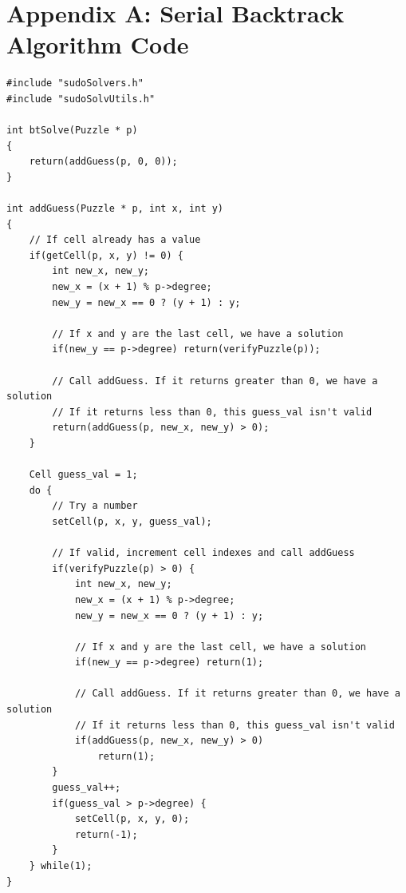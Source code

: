 \documentclass[11pt, a4paper]{article} %
\begin{document}
\section*{Appendix A: Serial Backtrack Algorithm Code}
\linespread{1}
\begin{verbatim}
#include "sudoSolvers.h"
#include "sudoSolvUtils.h"

int btSolve(Puzzle * p)
{
    return(addGuess(p, 0, 0));
}

int addGuess(Puzzle * p, int x, int y)
{
    // If cell already has a value
    if(getCell(p, x, y) != 0) {
        int new_x, new_y;
        new_x = (x + 1) % p->degree;
        new_y = new_x == 0 ? (y + 1) : y;

        // If x and y are the last cell, we have a solution
        if(new_y == p->degree) return(verifyPuzzle(p));

        // Call addGuess. If it returns greater than 0, we have a solution
        // If it returns less than 0, this guess_val isn't valid
        return(addGuess(p, new_x, new_y) > 0); 
    }

    Cell guess_val = 1;
    do {
        // Try a number
        setCell(p, x, y, guess_val);

        // If valid, increment cell indexes and call addGuess
        if(verifyPuzzle(p) > 0) {
            int new_x, new_y;
            new_x = (x + 1) % p->degree;
            new_y = new_x == 0 ? (y + 1) : y;

            // If x and y are the last cell, we have a solution
            if(new_y == p->degree) return(1);

            // Call addGuess. If it returns greater than 0, we have a solution
            // If it returns less than 0, this guess_val isn't valid
            if(addGuess(p, new_x, new_y) > 0) 
                return(1);
        }
        guess_val++;
        if(guess_val > p->degree) { 
            setCell(p, x, y, 0);
            return(-1);
        }
    } while(1);
}
\end{verbatim}
\linespread{1.5}
\end{document}
